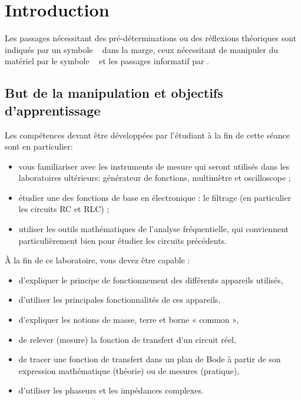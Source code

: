 \documentclass{../template/labo}
\author{The Fantastic Four} %
\begin{document}

\section{Introduction}


Les passages nécessitant des pré-déterminations ou des réflexions théoriques sont indiqués par un symbole \faCogs~ dans la marge,
ceux nécessitant de manipuler du matériel par le symbole \faFlask~ et les passages informatif par \faLightbulbO.


\subsection{But de la manipulation et objectifs d'apprentissage}

Les compétences devant être développées par l'étudiant à la fin de cette séance sont en particulier:
\begin{itemize}
	\item vous familiariser avec les instruments de mesure qui seront utilisés dans les laboratoires ultérieurs: générateur de fonctions, multimètre et oscilloscope ;
	\item étudier une des fonctions de base en électronique : le filtrage (en particulier les circuits RC et RLC) ;
	\item utiliser les outils mathématiques de l'analyse fréquentielle, qui conviennent particulièrement bien pour étudier les
circuits précédents.
\end{itemize}


À la fin de ce laboratoire, vous devez être capable :
\begin{itemize}
\item d'expliquer le principe de fonctionnement des différents appareils utilisés,
\item d'utiliser les principales fonctionnalités de ces appareils,
\item d'expliquer les notions de masse, terre et borne « common »,
\item de relever (mesure) la fonction de transfert d'un circuit réel,
\item de tracer une fonction de transfert dans un plan de Bode à partir de son expression mathématique (théorie) ou de
mesures (pratique),
\item d'utiliser les phaseurs et les impédances complexes.
\end{itemize}
\end{document}
